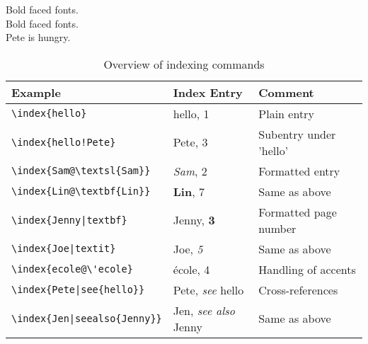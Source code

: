 \documentclass[10pt, a4paper]{article}
\begin{document}
\noindent Bold faced fonts.\\
Bold faced fonts.\\
Pete is hungry.

\begin{table}[htbp]
\caption{Overview of indexing commands}
\begin{center}
\begin{tabular}{|l|l|l|}
\hline
Example &	Index Entry	 & Comment\\
\hline
\verb+\index{hello}+ &	hello, 1	& Plain entry \\
\verb+\index{hello!Pete}+	&  Pete, 3	 &Subentry under 'hello'\\
\verb+\index{Sam@\textsl{Sam}}+&	\textsl{Sam}, 2	&Formatted entry\\
\verb+\index{Lin@\textbf{Lin}}	+&	\textbf{Lin}, 7	&Same as above\\
\verb+\index{Jenny|textbf}+&	Jenny, \textbf{3}	&Formatted page number\\
\verb+\index{Joe|textit}+&	Joe, \textit{5}	&Same as above\\
\verb+\index{ecole@\'ecole}+&	école, 4&	Handling of accents\\
\verb+\index{Pete|see{hello}}+&	Pete, \textit{see} hello	&Cross-references\\
\verb+\index{Jen|seealso{Jenny}}+ &	Jen, \textit{see also} Jenny	&Same as above\\
\hline

\end{tabular}
\end{center}
\label{default}
\end{table}%

\printindex %
\end{document}
